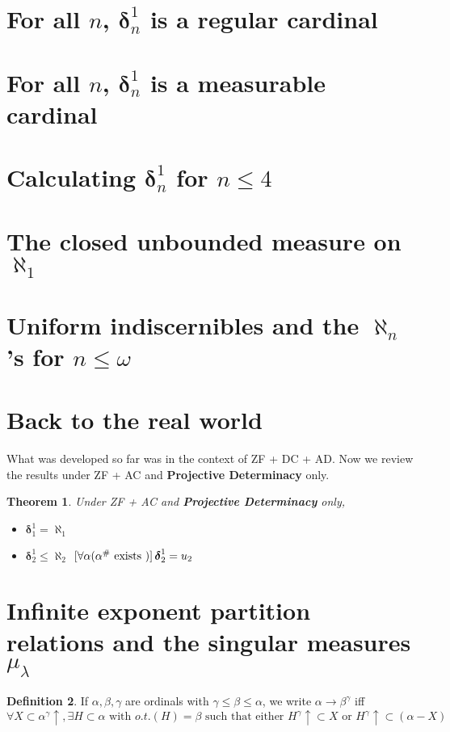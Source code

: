 \documentclass[bibother]{asl}
\newtheorem{thm}{Theorem}[section]
\theoremstyle{definition}
\newtheorem{defn}[thm]{Definition}
\theoremstyle{remark}
\newcommand{\bd}{\boldsymbol{\delta}}
\newcommand{\nl}{\hfill \break}
\begin{document}
\section{For all $n$, $\bd^1_n$ is a regular cardinal}
\section{For all $n$, $\bd^1_n$ is a measurable cardinal}

\section{Calculating $\bd^1_n$ for $n\le 4$}
\section{The closed unbounded measure on $\aleph_1$}
\section{Uniform indiscernibles and the $\aleph_n$'s for $n\le\omega$}
\section{Back to the real world}
What was developed so far was in the context of ZF + DC + AD. Now we review the results under ZF + AC and \textbf{Projective Determinacy} only.
\begin{thm}  Under ZF + AC and \textbf{Projective Determinacy} only,
\begin{itemize}
\item[1.] $\bd^1_1=\aleph_1$
\item[2.] $\bd^1_2\le \aleph_2$\nl
$[\forall \alpha (\alpha^{\#} \mbox{ \textrm{exists} })] \, \bd^1_2=u_2$
\end{itemize}
\end{thm}



\section{Infinite exponent partition relations and the singular measures $\mu_\lambda$}
\begin{defn}
If $\alpha, \beta, \gamma$ are ordinals with $\gamma \le \beta \le \alpha$, we write $\alpha \to \beta^\gamma$ iff $\forall X\subset \alpha^\gamma \uparrow, \exists H\subset\alpha \textrm{ with } o.t.(H)=\beta 
\textrm{ such that either } H^\gamma\uparrow \subset X 
\textrm{ or } H^\gamma\uparrow \subset (\alpha-X)  $
\end{defn}
\end{document}
